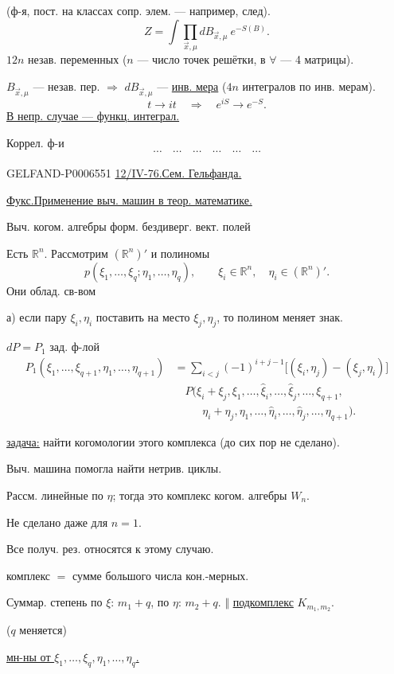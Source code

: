(ф-я, пост. на классах сопр. элем. --- например, след).
\[
Z=\int\prod_{\vec x,\mu}dB_{\vec x,\mu}\ e^{-S(B)}.
\]
\(12n\) незав. переменных (\(n\) --- число точек решётки, в \(\forall\) --- 4 матрицы).

\(B_{\vec x,\mu}\) --- незав. пер. \(\Longrightarrow\)
\(dB_{\vec x,\mu}\) --- \underline{инв. мера}
(\(4n\) интегралов по инв. мерам).
\[
t\to it\quad\Longrightarrow\quad e^{iS}\to e^{-S}.
\]
\underline{В непр. случае --- функц. интеграл.}

Коррел. ф-и
\[
\cdots\quad\cdots\quad\cdots\quad\cdots\quad\cdots\quad\cdots
\]


\begin{GelfandAdjacentEvidence}{GELFAND-P000655}{1}
\underline{12/IV-76.}\quad \underline{Сем. Гельфанда.}

\underline{\underline{Фукс.}}\quad \underline{Применение выч. машин в теор. математике.}

Выч. когом. алгебры форм. бездиверг. вект. полей

Есть \(\mathbb R^n\). Рассмотрим \((\mathbb R^n)'\) и полиномы
\[
p(\xi_1,\ldots,\xi_q;\eta_1,\ldots,\eta_q),\qquad
\xi_i\in\mathbb R^n,\quad\eta_i\in(\mathbb R^n)'.
\]
Они облад. св-вом

а) если пару \(\xi_i,\eta_i\) поставить на место \(\xi_j,\eta_j\), то полином меняет знак.

\(dP=P_1\) зад. ф-лой
\begin{align*}
P_1(\xi_1,\ldots,\xi_{q+1},\eta_1,\ldots,\eta_{q+1})
 &=\sum_{i<j}(-1)^{i+j-1}\big[(\xi_i,\eta_j)-(\xi_j,\eta_i)\big]\\
 &\quad P(\xi_i+\xi_j,\xi_1,\ldots,\widehat\xi_i,\ldots,
                \widehat\xi_j,\ldots,\xi_{q+1},\\
 &\qquad\;\;\eta_i+\eta_j,\eta_1,\ldots,\widehat\eta_i,\ldots,
                 \widehat\eta_j,\ldots,\eta_{q+1}).
\end{align*}

\underline{\underline{задача:}} найти когомологии этого комплекса (до сих пор не сделано).

Выч. машина помогла найти нетрив. циклы.

Рассм. линейные по \(\eta\); тогда это комплекс когом. алгебры \(W_n\).

Не сделано даже для \(n=1\).

Все получ. рез. относятся к этому случаю.

комплекс \(=\) сумме большого числа кон.-мерных.

Суммар. степень по \(\xi\): \(m_1+q\),
\quad по \(\eta\): \(m_2+q\).
\quad [Справа] \(\Vert\) \underline{подкомплекс} \(K_{m_1,m_2}\).

(\(q\) меняется)

\underline{мн-ны от \(\xi_1,\ldots,\xi_q,\eta_1,\ldots,\eta_q\).}
\end{GelfandAdjacentEvidence}
